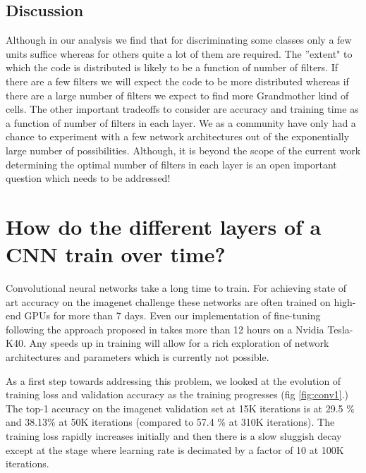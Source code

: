 \documentclass[runningheads]{llncs}
\begin{document}
\subsection{Discussion}
Although in our analysis we find that for discriminating some classes only a few units suffice whereas for others quite a lot of them are required. The ''extent" to which the code is distributed is likely to be a function of number of filters. If there are a few filters we will expect the code to be more distributed whereas if there are a large number of filters we expect to find more Grandmother kind of cells. The other important tradeoffs to consider are accuracy and training time as a function of number of filters in each layer. We as a community have only had a chance to experiment with a few network architectures out of the exponentially large number of possibilities. Although, it is beyond the scope of the current work determining the optimal number of filters in each layer is an open important question which needs to be addressed! 

\section{How do the different layers of a CNN train over time?}
\label{sec:speed}
Convolutional neural networks take a long time to train. For achieving state of art accuracy on the imagenet challenge these networks are often trained on high-end GPUs for more than 7 days. Even our implementation of fine-tuning following the approach proposed in \cite{Rcnn} takes more than 12 hours on a Nvidia Tesla-K40. Any speeds up in training will allow for a rich exploration of network architectures and parameters which is currently not possible.    

As a first step towards addressing this problem, we looked at the evolution of training loss and validation accuracy as the training progresses (fig \ref{fig:conv1}.) The top-1 accuracy on the imagenet validation set at 15K iterations is at 29.5 \% and 38.13\% at 50K iterations (compared to 57.4 \% at 310K iterations). The training loss rapidly increases initially and then there is a slow sluggish decay except at the stage where learning rate is decimated by a factor of 10 at 100K iterations.
\end{document}
